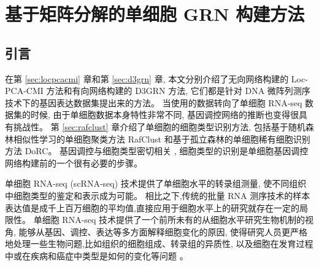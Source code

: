 \section{基于矩阵分解的单细胞 GRN 构建方法}
\label{sec:scgrnhunter}

\subsection{引言}

在第 \ref{sec:locpcacmi} 章和第 \ref{sec:d3grn} 章, 本文分别介绍了无向网络构建的 Loc-PCA-CMI 方法和有向网络构建的 D3GRN 方法, 
它们都是针对 DNA 微阵列测序技术下的基因表达数据集提出来的方法。
当使用的数据转向了单细胞 RNA-seq 数据集的时候, 
由于单细胞数据本身特性非常不同, 基因调控网络的推断也变得很具有挑战性。
第 \ref{sec:rafclust} 章介绍了单细胞的细胞类型识别方法,
包括基于随机森林相似性学习的单细胞聚类方法 RafClust 
和基于孤立森林的单细胞稀有细胞识别方法 DoRC。
基因调控与细胞类型密切相关 , 
细胞类型的识别是单细胞基因调控网络构建前的一个很有必要的步骤。

单细胞 RNA-seq (scRNA-seq) 技术提供了单细胞水平的转录组测量, 
使不同组织中细胞类型的鉴定和表示成为可能。
相比之下,传统的批量 RNA 测序技术的样本表达值是成千上百万细胞的平均值,直接应用于细胞水平上的研究就存在一定的局限性。
单细胞 RNA-seq 技术提供了一个前所未有的从细胞水平研究生物机制的视角,
能够从基因、调控、表达等多方面解释细胞变化的原因,
使得研究人员更严格地处理一些生物问题,比如组织的细胞组成、转录组的异质性,
以及细胞在发育过程中或在疾病和癌症中类型是如何的变化等问题 。

